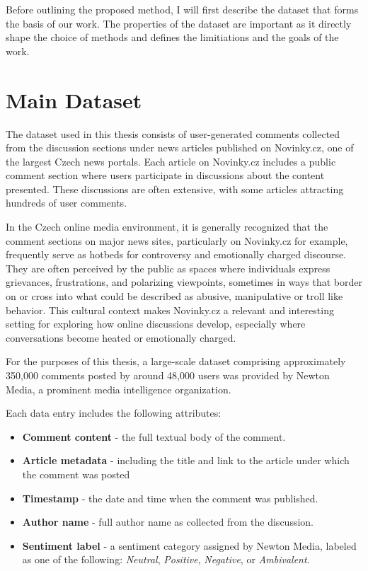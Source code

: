 \documentclass[twoside]{ctuthesis}
\theoremstyle{plain}
\theoremstyle{definition}
\theoremstyle{note}
\begin{document}
Before outlining the proposed method, I will first describe the dataset that forms the basis of our work. The properties of the dataset are important as it directly shape the choice of methods and defines the limitiations and the goals of the work. \par

\section{Main Dataset}
The dataset used in this thesis consists of user-generated comments collected from the discussion sections under news articles published on Novinky.cz, one of the largest Czech news portals. Each article on Novinky.cz includes a public comment section where users participate in discussions about the content presented. These discussions are often extensive, with some articles attracting hundreds of user comments.\par

In the Czech online media environment, it is generally recognized that the comment sections on major news sites, particularly on Novinky.cz for example, frequently serve as hotbeds for controversy and emotionally charged discourse. They are often perceived by the public as spaces where individuals express grievances, frustrations, and polarizing viewpoints, sometimes in ways that border on or cross into what could be described as abusive, manipulative or troll like behavior. This cultural context makes Novinky.cz a relevant and interesting setting for exploring how online discussions develop, especially where conversations become heated or emotionally charged.\par

For the purposes of this thesis, a large-scale dataset comprising approximately 350,000 comments posted by around 48,000 users was provided by Newton Media, a prominent media intelligence organization.\par 

Each data entry includes the following attributes:
\begin{itemize}
    \item \textbf{Comment content} - the full textual body of the comment.
    
    \item \textbf{Article metadata} - including the title and link to the article under which the comment was posted
    
    \item \textbf{Timestamp} - the date and time when the comment was published.
    
    \item \textbf{Author name} - full author name as collected from the discussion.
    
    \item \textbf{Sentiment label} - a sentiment category assigned by Newton Media, labeled as one of the following: \textit{Neutral}, \textit{Positive}, \textit{Negative}, or \textit{Ambivalent}.
\end{itemize}
\end{document}
